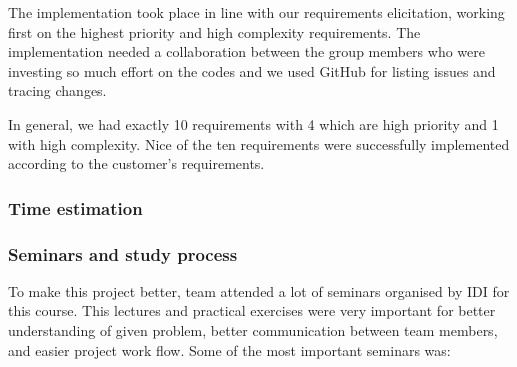 The implementation took place in line with our requirements elicitation, working first on the highest priority and high complexity requirements. The implementation needed a collaboration between the group members who were investing so much effort on the codes and we used GitHub for listing issues and tracing changes.

In general, we had exactly 10 requirements with 4 which are high priority and 1 with high complexity. Nice of the ten requirements were successfully implemented according to the customer's requirements.
	
	\subsubsection{Time estimation}
	
	\subsubsection{Seminars and study process}
	To make this project better, team attended a lot of seminars organised by IDI for this course. This lectures and practical exercises were very important for better understanding of given problem, better communication between team members, and easier project work flow. Some of the most important seminars was:
	
